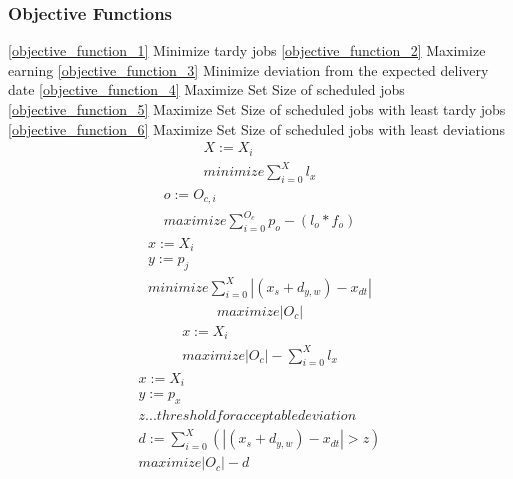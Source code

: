 \documentclass[a4paper,12pt,twoside]{scrreprt}
\begin{document}
\subsubsection{Objective Functions}
\begin{flushleft}
\autoref{objective_function_1} Minimize tardy jobs\linebreak
\autoref{objective_function_2} Maximize earning\linebreak
\autoref{objective_function_3} Minimize deviation from the expected delivery date\linebreak
\autoref{objective_function_4} Maximize Set Size of scheduled jobs\linebreak
\autoref{objective_function_5} Maximize Set Size of scheduled jobs with least tardy jobs\linebreak
\autoref{objective_function_6} Maximize Set Size of scheduled jobs with least deviations\linebreak
	\begin{equation}
	\label{objective_function_1}
	\begin{split}
		X := X_{i} \\
		minimize \sum_{i=0}^{X}l_{x} 
	\end{split}
	\end{equation}
	\begin{equation}
	\label{objective_function_2}
	\begin{split}
		o := O_{c,i} \\
		maximize \sum_{i=0}^{O_{c}}p_{o} - (l_{o} * f_{o})
	\end{split}
	\end{equation}
	\begin{equation}
	\label{objective_function_3}
	\begin{split}
		x := X_{i} \\
		y := p_{j} \\
		minimize \sum_{i=0}^{X} |(x_{s} + d_{y,w}) - x_{dt}|
	\end{split}
	\end{equation}
	\begin{equation}
	\label{objective_function_4}
	\begin{split}
		maximize |O_{c}|
	\end{split}
	\end{equation}
	\begin{equation}
	\label{objective_function_5}
	\begin{split}
		x := X_{i} \\
		maximize |O_{c}| - \sum_{i=0}^{X}l_{x}
	\end{split}
	\end{equation}
	\begin{equation}
	\label{objective_function_6}
	\begin{split}
		x := X_{i} \\
		y := p_{x} \\
		z ... threshold for acceptable deviation \\
		d := \sum_{i=0}^{X} (|(x_{s} + d_{y,w}) - x_{dt}| > z)\\
		maximize |O_{c}| - d
	\end{split}
	\end{equation}
\end{flushleft}
\end{document}
